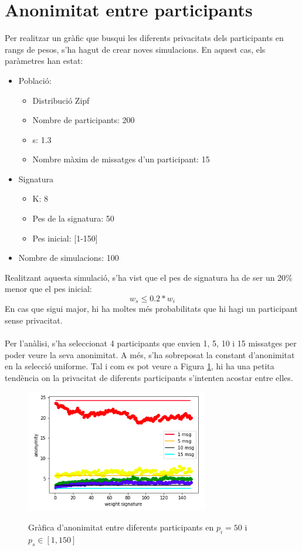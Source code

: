 \documentclass{article}
\begin{document}
\section{Anonimitat entre participants}
Per realitzar un gràfic que busqui les diferents privacitats dels participants en rangs de pesos, s'ha hagut de crear noves simulacions. En aquest cas, els paràmetres han estat:
\begin{itemize}
	\item Població:
	\begin{itemize}	
		\item Distribució Zipf
		\item Nombre de participants: 200
		\item s: 1.3
		\item Nombre màxim de missatges d'un participant: 15
	\end{itemize}
	\item Signatura
	\begin{itemize}
		\item K: 8
		\item Pes de la signatura: 50
		\item Pes inicial: [1-150]
	\end{itemize}
	\item Nombre de simulacions: 100
\end{itemize}
Realitzant aquesta simulació, s'ha vist que el pes de signatura ha de ser un 20\% menor que el pes inicial:
\[w_s \leq 0.2 * w_i\]
En cas que sigui major, hi ha moltes més probabilitats que hi hagi un participant sense privacitat.
\\
\\
Per l'anàlisi, s'ha seleccionat 4 participants que envien 1, 5, 10 i 15 missatges per poder veure la seva anonimitat. A més, s'ha sobreposat la constant d'anonimitat en la selecció uniforme. Tal i com es pot veure a Figura \ref{fig:anonymity}, hi ha una petita tendència on la privacitat de diferents participants s'intenten acostar entre elles.
\begin{figure}[H]
	\centering
	\includegraphics[width=8cm]{imgs/anonymity.png}
	\label{fig:anonymity}
	\caption{Gràfica d'anonimitat entre diferents participants en $p_i=50$ i $p_s\in[1,150]$}
\end{figure}
\end{document}
